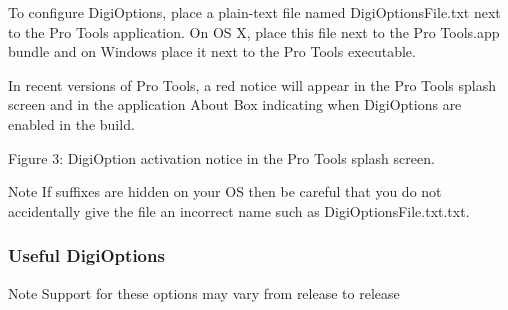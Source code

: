 To configure Digi\+Options, place a plain-\/text file named Digi\+Options\+File.\+txt next to the Pro Tools application. On O\+S X, place this file next to the Pro Tools.\+app bundle and on Windows place it next to the Pro Tools executable.

In recent versions of Pro Tools, a red notice will appear in the Pro Tools splash screen and in the application About Box indicating when Digi\+Options are enabled in the build.

  Figure 3\+: Digi\+Option activation notice in the Pro Tools splash screen.

 \begin{DoxyNote}{Note}
If suffixes are hidden on your O\+S then be careful that you do not accidentally give the file an incorrect name such as Digi\+Options\+File.\+txt.\+txt.
\end{DoxyNote}
\hypertarget{a00360_subsection__useful_digioptions}{}\subsubsection{Useful Digi\+Options}\label{a00360_subsection__useful_digioptions}
 \begin{DoxyNote}{Note}
Support for these options may vary from release to release
\end{DoxyNote}

